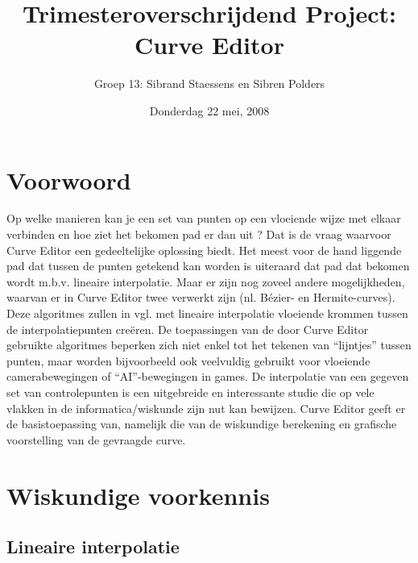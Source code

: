 \documentclass[a4paper,11pt,oneside, titlepage]{article}
\author{Groep 13: Sibrand Staessens en Sibren Polders}
\title{Trimesteroverschrijdend Project: Curve Editor}
\date{Donderdag 22 mei, 2008}
\begin{document}
\maketitle \newpage
\tableofcontents \newpage
\section{Voorwoord}
Op welke manieren kan je een set van punten op een vloeiende wijze met elkaar verbinden en hoe ziet het bekomen pad er dan uit ? Dat is
de vraag waarvoor Curve Editor een gedeeltelijke oplossing biedt. Het meest voor de hand liggende pad dat tussen de punten getekend kan worden 
is uiteraard dat pad dat bekomen wordt m.b.v. lineaire interpolatie. Maar er zijn nog zoveel andere mogelijkheden, waarvan er in Curve Editor twee verwerkt 
zijn (nl. Bézier- en Hermite-curves). Deze algoritmes zullen in vgl. met lineaire interpolatie vloeiende krommen
tussen de interpolatiepunten cre\"eren. De toepassingen van de door Curve Editor gebruikte algoritmes beperken zich niet enkel 
tot het tekenen van ``lijntjes'' tussen punten, maar worden bijvoorbeeld ook veelvuldig gebruikt voor vloeiende camerabewegingen of ``AI''-bewegingen in games.
De interpolatie van een gegeven set van controlepunten is een uitgebreide en interessante studie die 
op vele vlakken in de informatica/wiskunde zijn nut kan bewijzen. Curve Editor geeft er de 
basistoepassing van, namelijk die van de wiskundige berekening en grafische voorstelling van de gevraagde curve. \newline \newline \newline \newline
\newline \newline \newline \newline
\newpage
\section{Wiskundige voorkennis \label{wv}}
\subsection{Lineaire interpolatie}
\end{document}
